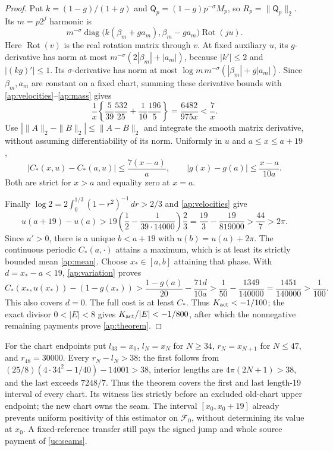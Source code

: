 \begin{proof}
Put $k=(1-g)/(1+g)$ and
$\mathsf Q_p=(1-g)p^{-\sigma}M_p$, so $R_p=\|\mathsf Q_p\|_2$.
Its $m=p2^j$ harmonic is
\[
 m^{-\sigma}
 \operatorname{diag}\bigl(k(\beta_m+ga_m),\beta_m-ga_m\bigr)
 \operatorname{Rot}(ju).
\]
Here $\operatorname{Rot}(v)$ is the real rotation matrix through $v$.
At fixed auxiliary $u$, its $g$-derivative has norm at most
$m^{-\sigma}(2|\beta_m|+|a_m|)$, because
$|k'|\le2$ and $|(kg)'|\le1$.
Its $\sigma$-derivative has norm at most
$\log m\,m^{-\sigma}(|\beta_m|+g|a_m|)$.
Since $\beta_m,a_m$ are constant on a fixed chart, summing these
derivative bounds with \eqref{ap:velocities}--\eqref{ap:mass} gives
\[
 \frac1x\left\{\frac5{39}\frac{532}{25}
                    +\frac1{10}\frac{196}{5}\right\}
 =\frac{6482}{975x}<\frac7x.
\]
Use $|\|A\|_2-\|B\|_2|\le\|A-B\|_2$ and integrate the smooth
matrix derivative, without assuming differentiability of its norm.
Uniformly in $u$ and $a\le x\le a+19$,
\begin{equation}
 |C_*(x,u)-C_*(a,u)|\le\frac{7(x-a)}a,\qquad
 |g(x)-g(a)|\le\frac{x-a}{10a}.
 \label{ap:variation}
\end{equation}
Both are strict for $x>a$ and equality zero at $x=a$.

Finally $\log2=2\int_0^{1/3}(1-r^2)^{-1}\,dr>2/3$ and
\eqref{ap:velocities} give
\[
 u(a+19)-u(a)>
 19\left(\frac12-\frac1{39\cdot14000}\right)\frac23
 =\frac{19}3-\frac{19}{819000}>\frac{44}7>2\pi.
\]
Since $u'>0$, there is a unique $b<a+19$ with
$u(b)=u(a)+2\pi$. The continuous periodic $C_*(a,\cdot)$
attains a maximum, which is at least its strictly bounded mean
\eqref{ap:mean}. Choose $x_*\in[a,b]$ attaining that phase.
With $d=x_*-a<19$, \eqref{ap:variation} proves
\[
 C_*(x_*,u(x_*))-(1-g(x_*))
 >\frac{1-g(a)}{20}-\frac{71d}{10a}
 >\frac1{50}-\frac{1349}{140000}
 =\frac{1451}{140000}>\frac1{100}.
\]
This also covers $d=0$. The full cost is at least $C_*$.
Thus $K_{\rm act}<-1/100$; the exact divisor $0<|E|<8$
gives $K_{\rm act}/|E|<-1/800$, after which the nonnegative
remaining payments prove \eqref{ap:theorem}.
\end{proof}

For the chart endpoints put $l_{33}=x_0$, $l_N=x_N$ for $N\ge34$,
$r_N=x_{N+1}$ for $N\le47$, and $r_{48}=30000$.
Every $r_N-l_N>38$: the first follows from
$(25/8)(4\cdot34^2-1/40)-14001>38$, interior lengths are
$4\pi(2N+1)>38$, and the last exceeds $7248/7$.
Thus the theorem covers the first and last length-19 interval of every
chart. Its witness lies strictly before an excluded old-chart upper
endpoint; the new chart owns the seam. The interval $[x_0,x_0+19]$
already prevents uniform positivity of this estimator on $\mathcal F_0$,
without determining its value at $x_0$. A fixed-reference transfer still
pays the signed jump and whole source payment of \eqref{uc:seams}.

